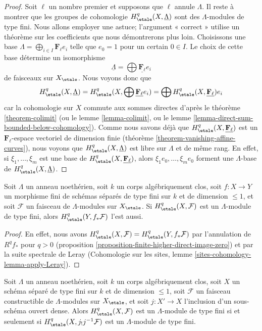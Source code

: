 \begin{proof}
\medskip\noindent
Soit $\ell$ un nombre premier et supposons que $\ell$ annule $\Lambda$.
Il reste à montrer que les groupes de cohomologie
$H^q_\etale(X, \underline{\Lambda})$ sont des $\Lambda$-modules de type fini.
Nous allons employer une astuce; l'argument « correct » utilise
un théorème sur les coefficients que nous démontrerons plus loin.
Choisissons une base $\Lambda = \bigoplus_{i \in I} \mathbf{F}_\ell e_i$
telle que $e_0 = 1$ pour un certain $0 \in I$.
Le choix de cette base détermine un isomorphisme
$$
\underline{\Lambda} = \bigoplus \underline{\mathbf{F}_\ell} e_i
$$
de faisceaux sur $X_\etale$. Nous voyons donc que
$$
H^q_\etale(X, \underline{\Lambda}) =
H^q_\etale(X, \bigoplus \underline{\mathbf{F}_\ell} e_i) =
\bigoplus H^q_\etale(X, \underline{\mathbf{F}_\ell})e_i
$$
car la cohomologie sur $X$ commute aux sommes directes d'après le
théorème \ref{theorem-colimit} (ou le lemme \ref{lemma-colimit}, ou le
lemme \ref{lemma-direct-sum-bounded-below-cohomology}).
Comme nous savons déjà que $H^q_\etale(X, \underline{\mathbf{F}_\ell})$
est un $\mathbf{F}_\ell$-espace vectoriel de dimension finie
(théorème \ref{theorem-vanishing-affine-curves}),
nous voyons que $H^q_\etale(X, \underline{\Lambda})$
est libre sur $\Lambda$ et de même rang.
En effet, si $\xi_1, \ldots, \xi_m$ est une base de
$H^q_\etale(X, \underline{\mathbf{F}_\ell})$, alors
$\xi_1 e_0, \ldots, \xi_m e_0$ forment une $\Lambda$-base de
$H^q_\etale(X, \underline{\Lambda})$.
\end{proof}

\begin{lemma}
\label{lemma-finite-pushforward-coefficients}
Soit $\Lambda$ un anneau noethérien, soit $k$ un corps algébriquement clos,
soit $f : X \to Y$ un morphisme fini de schémas séparés de type fini
sur $k$ et de dimension $\leq 1$, et soit $\mathcal{F}$ un faisceau
de $\Lambda$-modules sur $X_\etale$. Si
$H^q_\etale(X, \mathcal{F})$ est un $\Lambda$-module de type fini, alors
$H^q_\etale(Y, f_*\mathcal{F})$ l'est aussi.
\end{lemma}

\begin{proof}
En effet, nous avons $H^q_\etale(X, \mathcal{F}) = H^q_\etale(Y, f_*\mathcal{F})$
par l'annulation de $R^qf_*$ pour $q > 0$
(proposition \ref{proposition-finite-higher-direct-image-zero}) et par
la suite spectrale de Leray
(Cohomologie sur les sites, lemme \ref{sites-cohomology-lemma-apply-Leray}).
\end{proof}

\begin{lemma}
\label{lemma-restrict-to-open-coefficients}
Soit $\Lambda$ un anneau noethérien, soit $k$ un corps algébriquement clos,
soit $X$ un schéma séparé de type fini sur $k$ et de dimension $\leq 1$,
soit $\mathcal{F}$ un faisceau constructible de $\Lambda$-modules sur $X_\etale$,
et soit $j : X' \to X$ l'inclusion d'un sous-schéma ouvert dense. Alors
$H^q_\etale(X, \mathcal{F})$ est un $\Lambda$-module de type fini si et seulement si
$H^q_\etale(X, j_!j^{-1}\mathcal{F})$ est un $\Lambda$-module de type fini.
\end{lemma}

